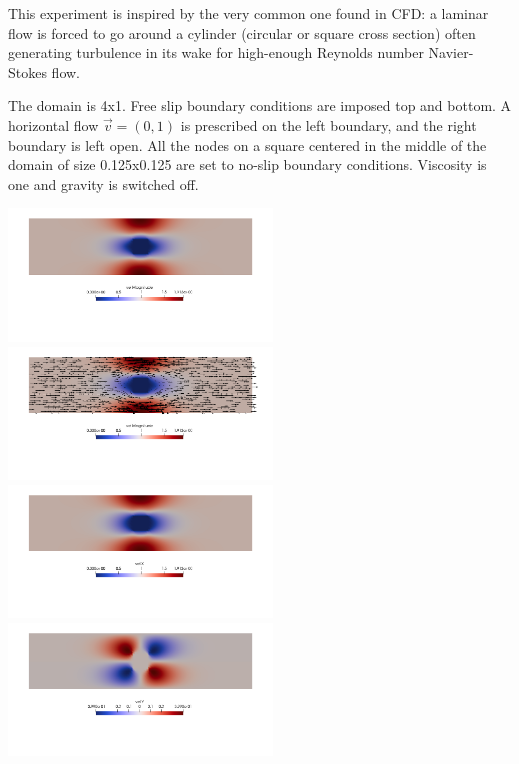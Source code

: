 This experiment is inspired by the very common one found in CFD: a laminar flow 
is forced to go around a cylinder (circular or square cross section) often 
generating turbulence in its wake for high-enough Reynolds number Navier-Stokes flow.

The domain is 4x1. Free slip boundary conditions are imposed top and bottom. 
A horizontal flow $\vec{v}=(0,1)$ is prescribed on the left boundary, and the 
right boundary is left open. All the nodes on a square centered in the middle of the domain 
of size 0.125x0.125 are set to no-slip boundary conditions.
Viscosity is one and gravity is switched off.

\begin{center}
\includegraphics[width=7cm]{python_codes/fieldstone_78/results/cylinder/vel}
\includegraphics[width=7cm]{python_codes/fieldstone_78/results/cylinder/vel2}\\
\includegraphics[width=7cm]{python_codes/fieldstone_78/results/cylinder/u}
\includegraphics[width=7cm]{python_codes/fieldstone_78/results/cylinder/v}\\

\end{center}
